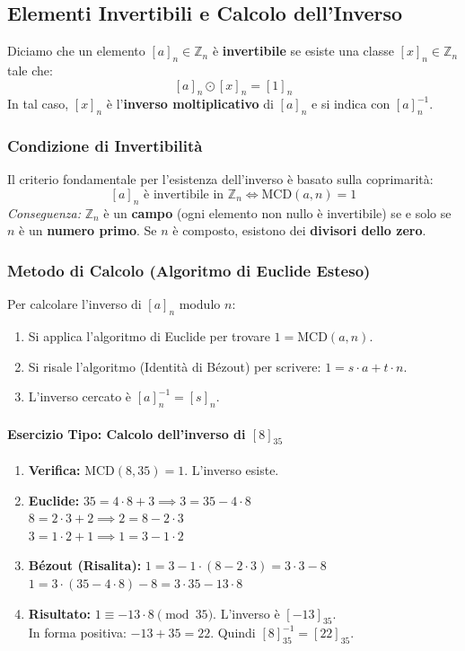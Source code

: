 \documentclass[12pt, a4paper]{article}
\begin{document}
\subsection{Elementi Invertibili e Calcolo dell'Inverso}
Diciamo che un elemento $[a]_n \in \mathbb{Z}_n$ è \textbf{invertibile} se esiste una classe $[x]_n \in \mathbb{Z}_n$ tale che:
\[ [a]_n \odot [x]_n = [1]_n \]
In tal caso, $[x]_n$ è l'\textbf{inverso moltiplicativo} di $[a]_n$ e si indica con $[a]_n^{-1}$.

\subsubsection*{Condizione di Invertibilità}
Il criterio fondamentale per l'esistenza dell'inverso è basato sulla coprimarità:
\[ [a]_n \text{ è invertibile in } \mathbb{Z}_n \iff \text{MCD}(a, n) = 1 \]
\emph{Conseguenza:} $\mathbb{Z}_n$ è un \textbf{campo} (ogni elemento non nullo è invertibile) se e solo se $n$ è un \textbf{numero primo}. Se $n$ è composto, esistono dei \textbf{divisori dello zero}.

\subsubsection*{Metodo di Calcolo (Algoritmo di Euclide Esteso)}
Per calcolare l'inverso di $[a]_n$ modulo $n$:
\begin{enumerate}
    \item Si applica l'algoritmo di Euclide per trovare $1 = \text{MCD}(a, n)$.
    \item Si risale l'algoritmo (Identità di Bézout) per scrivere: $1 = s \cdot a + t \cdot n$.
    \item L'inverso cercato è $[a]_n^{-1} = [s]_n$.
\end{enumerate}

\paragraph{Esercizio Tipo: Calcolo dell'inverso di $[8]_{35}$}
\begin{enumerate}
    \item \textbf{Verifica:} $\text{MCD}(8, 35) = 1$. L'inverso esiste.
    \item \textbf{Euclide:} 
    $35 = 4 \cdot 8 + 3 \implies 3 = 35 - 4 \cdot 8$ \\
    $8 = 2 \cdot 3 + 2 \implies 2 = 8 - 2 \cdot 3$ \\
    $3 = 1 \cdot 2 + 1 \implies 1 = 3 - 1 \cdot 2$
    \item \textbf{Bézout (Risalita):} 
    $1 = 3 - 1 \cdot (8 - 2 \cdot 3) = 3 \cdot 3 - 8$ \\
    $1 = 3 \cdot (35 - 4 \cdot 8) - 8 = 3 \cdot 35 - 13 \cdot 8$
    \item \textbf{Risultato:} $1 \equiv -13 \cdot 8 \pmod{35}$. L'inverso è $[-13]_{35}$. \\
    In forma positiva: $-13 + 35 = 22$. Quindi $[8]_{35}^{-1} = [22]_{35}$.
\end{enumerate}
\end{document}
